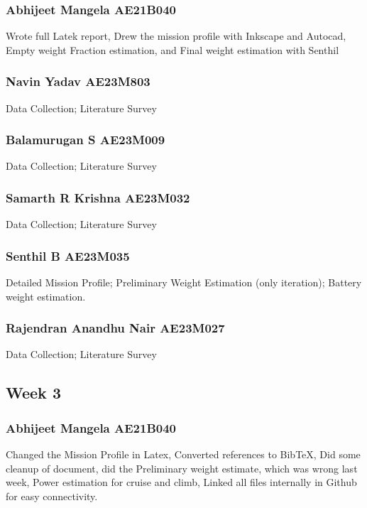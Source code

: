 \documentclass[12 pt]{article}
\begin{document}
\subsubsection{Abhijeet Mangela AE21B040}
Wrote full Latek report, Drew the mission profile with Inkscape and Autocad, Empty weight Fraction estimation, and Final weight estimation with Senthil

\subsubsection{Navin Yadav AE23M803}

Data Collection; Literature Survey

\subsubsection{Balamurugan S AE23M009}

Data Collection; Literature Survey

\subsubsection{Samarth R Krishna AE23M032}

Data Collection; Literature Survey

\subsubsection{Senthil B AE23M035}

Detailed Mission Profile; Preliminary Weight Estimation (only iteration); Battery weight estimation.

\subsubsection{Rajendran Anandhu Nair AE23M027}

Data Collection; Literature Survey




\subsection{Week 3}


\subsubsection{Abhijeet Mangela AE21B040}
Changed the Mission Profile in Latex, Converted references to BibTeX, Did some cleanup of document, did the Preliminary weight estimate, which was wrong last week, Power estimation for cruise and climb, Linked all files internally in Github for easy connectivity.
\end{document}
